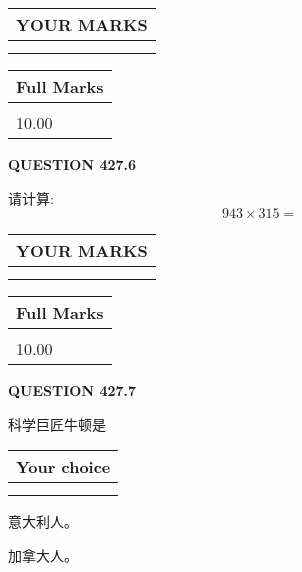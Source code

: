 \documentclass{ctexart}
\begin{document}
\vspace{0.2in}
  
\noindent\begin{tabular}{|l|}
\hline
 YOUR MARKS  \\
\hline
 \\ 
 \\ 
\hline
\end{tabular}
\hspace{0.05in} \begin{tabular}{|l|}
\hline
 Full Marks  \\
\hline
 \\ 
10.00 \\
\hline
\end{tabular}
{\textbf{\Large{QUESTION
427.6 
}}}
  
  
 
请计算:
\begin{equation}
943  \times    %
315 = \nonumber
\end{equation}
 

 

 
  
\vspace{0.2in}
  
\noindent\begin{tabular}{|l|}
\hline
 YOUR MARKS  \\
\hline
 \\ 
 \\ 
\hline
\end{tabular}
\hspace{0.05in} \begin{tabular}{|l|}
\hline
 Full Marks  \\
\hline
 \\ 
10.00 \\
\hline
\end{tabular}
{\textbf{\Large{QUESTION
427.7 
}}}
  
  
科学巨匠牛顿是
  
  
\noindent\hspace{3.0in} \begin{tabular}{|l|}
\hline
Your choice \\
\hline
 \\ 
 \\ 
\hline
\end{tabular}
  
  
 
 
意大利人。
 
 
加拿大人。
 
\end{document}
